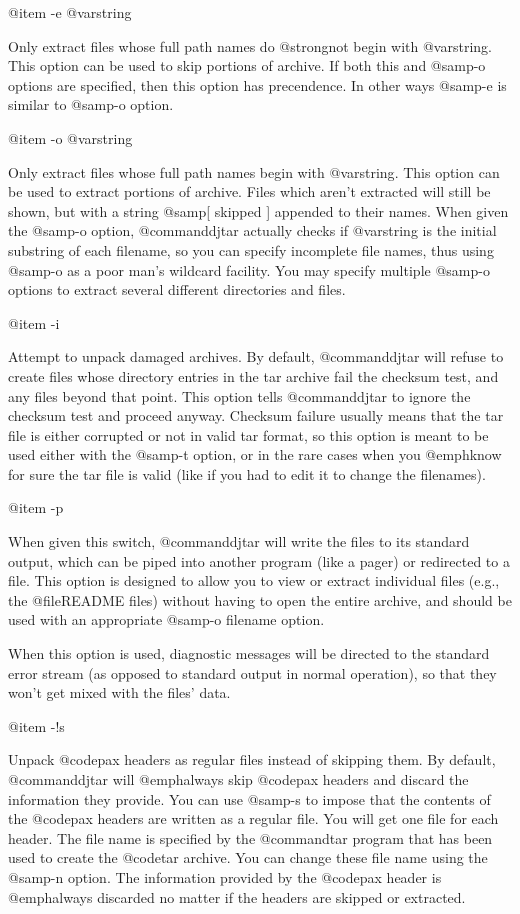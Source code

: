 @item -e @var{string}

Only extract files whose full path names do @strong{not} begin with @var{string}.
This option can be used to skip portions of archive.  If both this
and @samp{-o} options are specified, then this option has precendence.  In
other ways @samp{-e} is similar to @samp{-o} option.

@item -o @var{string}

Only extract files whose full path names begin with @var{string}.
This option can be used to extract portions of archive.  Files which aren't
extracted will still be shown, but with a string @samp{[ skipped ]}
appended to their names.  When given the @samp{-o} option, @command{djtar}
actually checks if @var{string} is the initial substring of each filename,
so you can specify incomplete file names, thus using @samp{-o} as a poor man's
wildcard facility.  You may specify multiple @samp{-o} options to extract
several different directories and files.

@item -i

Attempt to unpack damaged archives.
By default, @command{djtar} will refuse to create files whose directory
entries in the tar archive fail the checksum test, and any files beyond
that point.  This option tells @command{djtar} to ignore the checksum test
and proceed anyway.  Checksum failure usually means that the tar file is
either corrupted or not in valid tar format, so this option is meant to be
used either with the @samp{-t} option, or in the rare cases when you
@emph{know} for sure the tar file is valid (like if you had to edit it to
change the filenames).

@item -p

When given this switch, @command{djtar} will write the files to its standard
output, which can be piped into another program (like a pager) or
redirected to a file.  This option is designed to allow you to view or
extract individual files (e.g., the @file{README} files) without having to
open the entire archive, and should be used with an appropriate @samp{-o
filename} option.

When this option is used, diagnostic messages will be directed to the
standard error stream (as opposed to standard output in normal operation),
so that they won't get mixed with the files' data.

@item -!s

Unpack @code{pax} headers as regular files instead of skipping them.
By default, @command{djtar} will @emph{always} skip @code{pax} headers and
discard the information they provide.  You can use @samp{-s} to impose that
the contents of the @code{pax} headers are written as a regular file.  You will
get one file for each header.  The file name is specified by the @command{tar}
program that has been used to create the @code{tar} archive.  You can change
these file name using the @samp{-n} option.  The information provided by the
@code{pax} header is @emph{always} discarded no matter if the headers are
skipped or extracted. 

